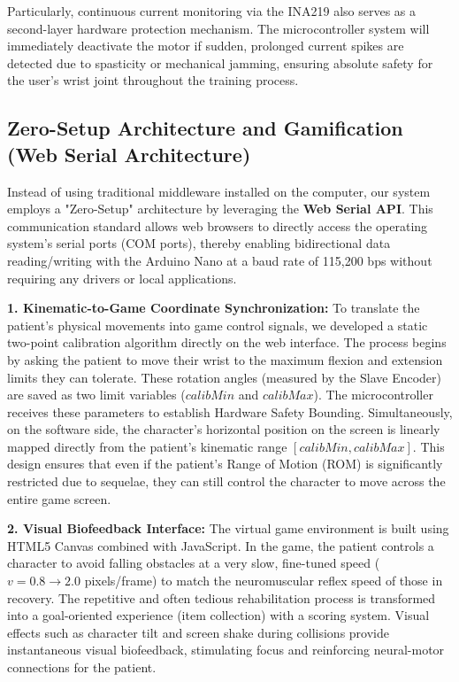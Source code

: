 \documentclass[conference]{IEEEtran}
\begin{document}
Particularly, continuous current monitoring via the INA219 also serves as a second-layer hardware protection mechanism. The microcontroller system will immediately deactivate the motor if sudden, prolonged current spikes are detected due to spasticity or mechanical jamming, ensuring absolute safety for the user's wrist joint throughout the training process.
\subsection{Zero-Setup Architecture and Gamification (Web Serial Architecture)}

Instead of using traditional middleware installed on the computer, our system employs a "Zero-Setup" architecture by leveraging the \textbf{Web Serial API}. This communication standard allows web browsers to directly access the operating system's serial ports (COM ports), thereby enabling bidirectional data reading/writing with the Arduino Nano at a baud rate of 115,200 bps without requiring any drivers or local applications.

\textbf{1. Kinematic-to-Game Coordinate Synchronization:}
To translate the patient's physical movements into game control signals, we developed a static two-point calibration algorithm directly on the web interface. The process begins by asking the patient to move their wrist to the maximum flexion and extension limits they can tolerate. These rotation angles (measured by the Slave Encoder) are saved as two limit variables ($calibMin$ and $calibMax$). The microcontroller receives these parameters to establish Hardware Safety Bounding. Simultaneously, on the software side, the character's horizontal position on the screen is linearly mapped directly from the patient's kinematic range $[calibMin, calibMax]$. This design ensures that even if the patient's Range of Motion (ROM) is significantly restricted due to sequelae, they can still control the character to move across the entire game screen.

\textbf{2. Visual Biofeedback Interface:}
The virtual game environment is built using HTML5 Canvas combined with JavaScript. In the game, the patient controls a character to avoid falling obstacles at a very slow, fine-tuned speed ($v = 0.8 \to 2.0$ pixels/frame) to match the neuromuscular reflex speed of those in recovery. The repetitive and often tedious rehabilitation process is transformed into a goal-oriented experience (item collection) with a scoring system. Visual effects such as character tilt and screen shake during collisions provide instantaneous visual biofeedback, stimulating focus and reinforcing neural-motor connections for the patient.
\end{document}
